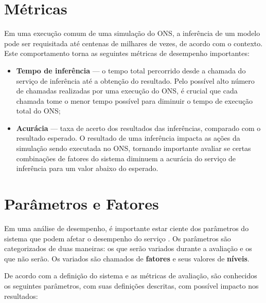 
\section{Métricas}

Em uma execução comum de uma simulação do ONS, a inferência de um modelo pode ser requisitada até centenas de milhares de vezes, de acordo com o contexto. Este comportamento torna as seguintes métricas de desempenho importantes:

\begin{itemize}
  \item \textbf{Tempo de inferência} — o tempo total percorrido desde a chamada do serviço de inferência até a obtenção do resultado. Pelo possível alto número de chamadas realizadas por uma execução do ONS, é crucial que cada chamada tome o menor tempo possível para diminuir o tempo de execução total do ONS;
  \item \textbf{Acurácia} — taxa de acerto dos resultados das inferências, comparado com o resultado esperado. O resultado de uma inferência impacta as ações da simulação sendo executada no ONS, tornando importante avaliar se certas combinações de fatores do sistema diminuem a acurácia do serviço de inferência para um valor abaixo do esperado.
\end{itemize}

\section{Parâmetros e Fatores}
\label{paramsfactors}

Em uma análise de desempenho, é importante estar ciente dos parâmetros do sistema que podem afetar o desempenho do serviço \cite{jain1991art}. Os parâmetros são categorizados de duas maneiras: os que serão variados durante a avaliação e os que não serão. Os variados são chamados de \textbf{fatores} e seus valores de \textbf{níveis}.

De acordo com a definição do sistema e as métricas de avaliação, são conhecidos os seguintes parâmetros, com suas definições descritas, com possível impacto nos resultados:

